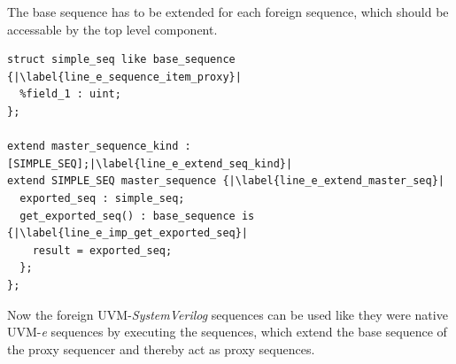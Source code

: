 The base sequence has to be extended for each foreign sequence, which should be accessable by the top level component.
\lstset{language=e, numbers = left, escapechar=|, breaklines=true}
\begin{lstlisting}[frame=htrbl, caption={\textit{e}: exporting the foreign UVM-SystemVerilog sequence},
label={lst:e_exporting_sequence}]
struct simple_seq like base_sequence {|\label{line_e_sequence_item_proxy}|
  %field_1 : uint;
};

extend master_sequence_kind : [SIMPLE_SEQ];|\label{line_e_extend_seq_kind}|
extend SIMPLE_SEQ master_sequence {|\label{line_e_extend_master_seq}|
  exported_seq : simple_seq;
  get_exported_seq() : base_sequence is {|\label{line_e_imp_get_exported_seq}|
    result = exported_seq;
  };
};
\end{lstlisting}
Now the foreign UVM-\emph{SystemVerilog} sequences can be used like they were native UVM-\textit{e} sequences by executing the sequences, which extend the base sequence of the proxy sequencer and thereby act as proxy sequences.
